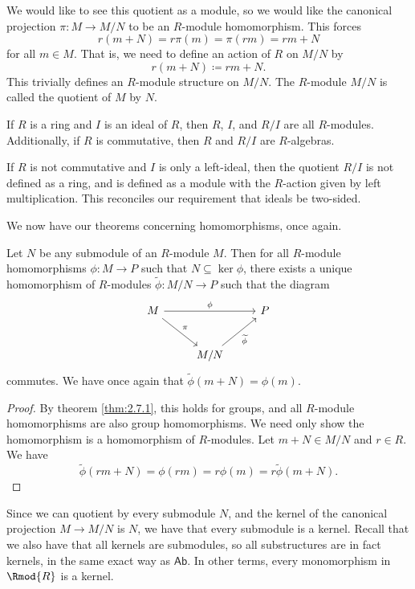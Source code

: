 We would like to see this quotient as a module, so we would like the canonical projection $\pi : M \to M /N$ to be an $R$-module homomorphism. This forces
\[
	r(m+N)=r\pi (m)=\pi (rm)=rm+N
\]
for all $m\in M$. That is, we need to define an action of $R$ on $M /N$ by
\[
	r(m+N) \coloneqq rm + N
.\]
This trivially defines an $R$-module structure on $M /N$. The $R$-module $M /N$ is called the quotient of $M$ by $N$.

If $R$ is a ring and $I$ is an ideal of $R$, then $R$, $I$, and $R /I$ are all $R$-modules. Additionally, if $R$ is commutative, then $R$ and $R /I$ are $R$-algebras.

If $R$ is not commutative and $I$ is only a left-ideal, then the quotient $R /I$ is not defined as a ring, and is defined as a module with the $R$-action given by left multiplication. This reconciles our requirement that ideals be two-sided.

We now have our theorems concerning homomorphisms, once again.
\begin{theorem}\label{thm:3.5.1}
	Let $N$ be any submodule of an $R$-module $M$. Then for all $R$-module homomorphisms $\phi : M \to P$ such that $N\subseteq \ker \phi $, there exists a unique homomorphism of $R$-modules $\widetilde{\phi} : M /N \to P$ such that the diagram
	\[\begin{tikzcd}[row sep=2.5em, column sep=2.5em]
		M\arrow[rr, "\phi "]\arrow[dr, "\pi "]&&P\\
						      &M /N\arrow[ru, "\widetilde{\phi}"']
	\end{tikzcd}\]
	commutes. We have once again that $\widetilde{\phi} (m+N)=\phi (m)$.
\end{theorem}
\begin{proof}
	By theorem \ref{thm:2.7.1}, this holds for groups, and all $R$-module homomorphisms are also group homomorphisms. We need only show the homomorphism is a homomorphism of $R$-modules. Let $m+N\in M /N$ and $r\in R$. We have
	\[
		\widetilde{\phi}  (rm+N)=\phi (rm)=r\phi (m)=r\widetilde{\phi}(m+N)
	.\]
\end{proof}

Since we can quotient by every submodule $N$, and the kernel of the canonical projection $M\to M /N$ is $N$, we have that every submodule is a kernel. Recall that we also have that all kernels are submodules, so all substructures are in fact kernels, in the same exact way as $\mathsf{Ab}$. In other terms, every monomorphism in $\Rmod{R} $ is a kernel.

